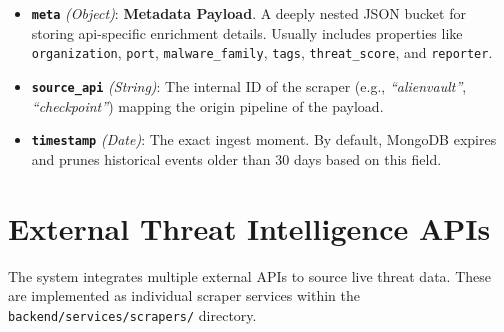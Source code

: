 \documentclass[12pt,a4paper]{article}
\begin{document}
\begin{itemize}[leftmargin=*]
    \item \textbf{\texttt{meta}} \textit{(Object)}: \textbf{Metadata Payload}. A deeply nested JSON bucket for storing api-specific enrichment details. Usually includes properties like \texttt{organization}, \texttt{port}, \texttt{malware\_family}, \texttt{tags}, \texttt{threat\_score}, and \texttt{reporter}.
    \item \textbf{\texttt{source\_api}} \textit{(String)}: The internal ID of the scraper (e.g., \textit{``alienvault''}, \textit{``checkpoint''}) mapping the origin pipeline of the payload.
    \item \textbf{\texttt{timestamp}} \textit{(Date)}: The exact ingest moment. By default, MongoDB expires and prunes historical events older than 30 days based on this field.
\end{itemize}

\newpage
\section{External Threat Intelligence APIs}

The system integrates multiple external APIs to source live threat data. These are implemented as individual scraper services within the \verb|backend/services/scrapers/| directory.
\end{document}
